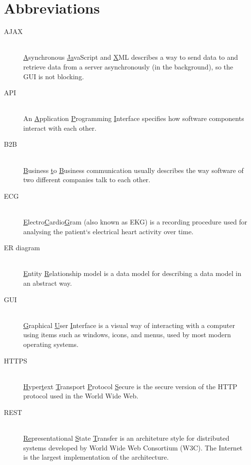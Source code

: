 \chapter*{Abbreviations}\label{abbr}

\begin{description}
	\item[AJAX] \hfill \\ \underline{A}synchronous \underline{Ja}vaScript and \underline{X}ML describes a way to send data to and retrieve data from a server asynchronously (in the background), so the GUI is not blocking.
	\item[API\label{API}] \hfill \\ An \underline{A}pplication \underline{P}rogramming \underline{I}nterface specifies how software components interact with each other.
	\item[B2B] \hfill \\ \underline{B}usiness \underline{t}o \underline{B}usiness communication usually describes the way software of two different companies talk to each other.
	\item[ECG\label{ECG}] \hfill \\ \underline{E}lectro\underline{C}ardio\underline{G}ram (also known as EKG) is a recording procedure used for analysing the patient`s electrical heart activity over time.
	\item[ER diagram\label{ERdiagram}] \hfill \\ \underline{E}ntity \underline{R}elationship model is a data model for describing a data model in an abstract way.
	\item[GUI\label{GUI}] \hfill \\ \underline{G}raphical \underline{U}ser \underline{I}nterface is a visual way of interacting with a computer using items such as windows, icons, and menus, used by most modern operating systems.
	\item[HTTPS\label{HTTP}] \hfill \\ \underline{H}yper\underline{t}ext \underline{T}ransport \underline{P}rotocol \underline{S}ecure is the secure version of the HTTP protocol used in the World Wide Web.
	\item[REST\label{REST}] \hfill \\ \underline{Re}presentational \underline{S}tate \underline{T}ransfer is an architeture style for distributed systems developed by World Wide Web Consortium (W3C). The Internet is the largest implementation of the architecture.
\end{description}
